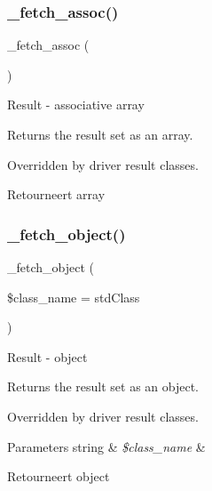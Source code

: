 \subsubsection{\texorpdfstring{\_fetch\_assoc()}{\_fetch\_assoc()}}
{\footnotesize\ttfamily \+\_\+fetch\+\_\+assoc (\begin{DoxyParamCaption}{ }\end{DoxyParamCaption})\hspace{0.3cm}{\ttfamily [protected]}}

Result -\/ associative array

Returns the result set as an array.

Overridden by driver result classes.

\begin{DoxyReturn}{Retourneert}
array 
\end{DoxyReturn}
\mbox{\label{class_c_i___d_b__result_a60806be6a9c2488820813c2a7f4fef71}} 
\subsubsection{\texorpdfstring{\_fetch\_object()}{\_fetch\_object()}}
{\footnotesize\ttfamily \+\_\+fetch\+\_\+object (\begin{DoxyParamCaption}\item[{}]{\$class\+\_\+name = {\ttfamily \textquotesingle{}stdClass\textquotesingle{}} }\end{DoxyParamCaption})\hspace{0.3cm}{\ttfamily [protected]}}

Result -\/ object

Returns the result set as an object.

Overridden by driver result classes.


\begin{DoxyParams}[1]{Parameters}
string & {\em \$class\+\_\+name} & \\
\hline
\end{DoxyParams}
\begin{DoxyReturn}{Retourneert}
object 
\end{DoxyReturn}
\mbox{\label{class_c_i___d_b__result_a5ac3523f878efb629fae30a7d9156e77}} 
